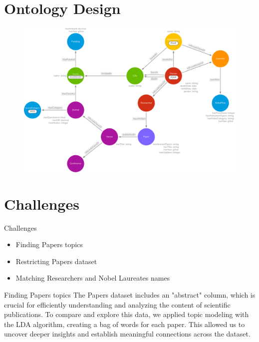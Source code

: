 \documentclass[aspectratio=169,xcolor=dvipsnames]{beamer}
\begin{document}
\section{Ontology Design}

\begin{frame}
	\begin{figure}
		\includegraphics[width=0.75\linewidth]{../nobelOntologyTransparent.png}
	\end{figure}
\end{frame}

\section{Challenges}

\begin{frame}{Challenges}
	\begin{itemize}
		\item Finding Papers topics
		      \vspace{1em}
		\item Restricting Papers dataset
		      \vspace{1em}
		\item Matching Researchers and Nobel Laureates names
	\end{itemize}
\end{frame}

\begin{frame}{Finding Papers topics}
	The Papers dataset includes an "abstract" column, which is crucial for efficiently understanding
	and analyzing the content of scientific publications. To compare and explore this data, we applied
	topic modeling with the LDA algorithm, creating a bag of words for each paper. This allowed us to
	uncover deeper insights and establish meaningful connections across the dataset.
\end{frame}
\end{document}

